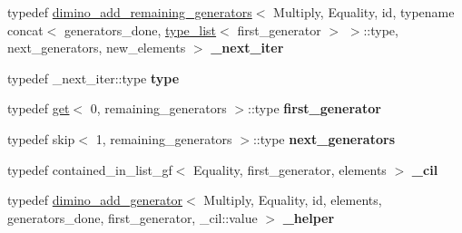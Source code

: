 \begin{DoxyCompactItemize}
typedef \hyperlink{struct_eigen_1_1internal_1_1group__theory_1_1dimino__add__remaining__generators}{dimino\+\_\+add\+\_\+remaining\+\_\+generators}$<$ Multiply, Equality, id, typename concat$<$ generators\+\_\+done, \hyperlink{struct_eigen_1_1internal_1_1type__list}{type\+\_\+list}$<$ first\+\_\+generator $>$ $>$\+::type, next\+\_\+generators, new\+\_\+elements $>$ {\bfseries \+\_\+next\+\_\+iter}
\item 
\mbox{\label{struct_eigen_1_1internal_1_1group__theory_1_1dimino__add__remaining__generators_a446f68a9af3665750427f885a44e0633}} 
typedef \+\_\+next\+\_\+iter\+::type {\bfseries type}
\item 
\mbox{\label{struct_eigen_1_1internal_1_1group__theory_1_1dimino__add__remaining__generators_a186f4226ef3ff3b8551e3074d7e81fc6}} 
typedef \hyperlink{struct_eigen_1_1internal_1_1get}{get}$<$ 0, remaining\+\_\+generators $>$\+::type {\bfseries first\+\_\+generator}
\item 
\mbox{\label{struct_eigen_1_1internal_1_1group__theory_1_1dimino__add__remaining__generators_a373cd862068ba384dcee521b0ba856ed}} 
typedef skip$<$ 1, remaining\+\_\+generators $>$\+::type {\bfseries next\+\_\+generators}
\item 
\mbox{\label{struct_eigen_1_1internal_1_1group__theory_1_1dimino__add__remaining__generators_ab87e81a8995394df6d4955b8dc368966}} 
typedef contained\+\_\+in\+\_\+list\+\_\+gf$<$ Equality, first\+\_\+generator, elements $>$ {\bfseries \+\_\+cil}
\item 
\mbox{\label{struct_eigen_1_1internal_1_1group__theory_1_1dimino__add__remaining__generators_a3ab71439113d9a0ab307ab15d35889d3}} 
typedef \hyperlink{struct_eigen_1_1internal_1_1group__theory_1_1dimino__add__generator}{dimino\+\_\+add\+\_\+generator}$<$ Multiply, Equality, id, elements, generators\+\_\+done, first\+\_\+generator, \+\_\+cil\+::value $>$ {\bfseries \+\_\+helper}
\item 

\end{DoxyCompactItemize}

